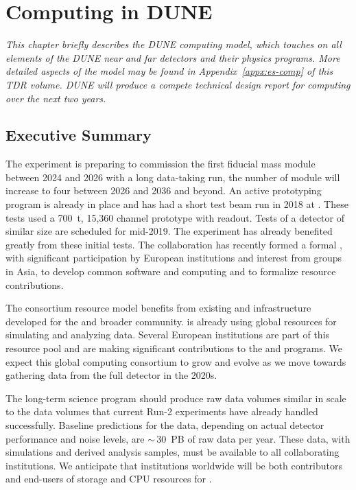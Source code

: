 \chapter{Computing in DUNE}
\label{ch:exec-comp}

\textit{This chapter briefly describes the DUNE computing model, which touches on all elements of the DUNE near and far detectors and their physics programs.  More detailed aspects of the model may be found in Appendix~\ref{appx:es-comp} of this TDR volume.  DUNE will produce a compete technical design report for computing over the next two years.}

\section{Executive Summary}
\label{ch:exec-comp-es}


The  experiment is preparing to commission the first \nominalmodsize fiducial mass  module between 2024 and 2026 with a long data-taking run, the number of module will increase to four between 2026 and 2036 and beyond.  An active prototyping program is already in place and has had  a short test beam run in 2018 at .  These tests used  a \SI{700}{t}, 15,360 channel prototype  with  readout.  Tests of a  detector of similar size are scheduled for mid-2019.   The  experiment has already  benefited greatly from these initial tests.  The collaboration has recently formed a formal , with significant participation by European institutions and interest from groups in Asia, to develop common software and computing and to formalize resource contributions.

The consortium resource model benefits from existing   and  infrastructure developed for the  and broader  community.   is already using global resources for simulating and analyzing   data.  Several European institutions are part of this resource pool and are making significant contributions to the  and  programs.  We expect this global computing consortium to grow and evolve as we move towards gathering data from the full  detector in the 2020s.

The long-term  science program should produce raw data volumes similar in scale to the data volumes that current  Run-2 experiments have already handled successfully.  Baseline predictions for the  data, depending on actual detector performance and noise levels, are $\sim\,$\SI{30}{PB} of raw data per year.  These data, with simulations and derived analysis samples, must be available to all collaborating institutions.  We anticipate that institutions worldwide will be both contributors and end-users of storage and CPU resources for .




